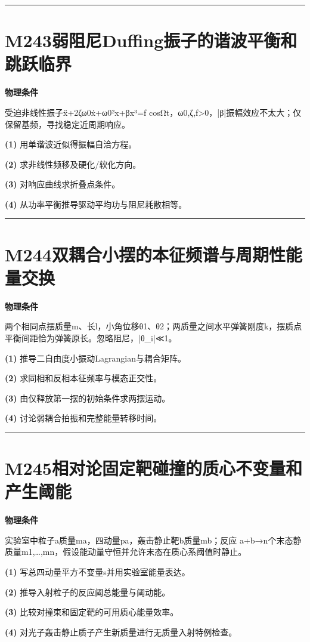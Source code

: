 \documentclass[UTF8,a4paper,11pt,oneside,openany]{ctexbook}
\begin{document}
\par\bigskip\hrule\bigskip
\section*{M243\quad 弱阻尼Duffing振子的谐波平衡和跳跃临界}
\textbf{物理条件}\par 受迫非线性振子ẍ+2ζω0ẋ+ω0²x+βx³=f cosΩt，ω0,ζ,f>0，|β|振幅效应不太大；仅保留基频，寻找稳定近周期响应。
\par\noindent\textbf{(1)} 用单谐波近似得振幅自洽方程。
\par\noindent\textbf{(2)} 求非线性频移及硬化/软化方向。
\par\noindent\textbf{(3)} 对响应曲线求折叠点条件。
\par\noindent\textbf{(4)} 从功率平衡推导驱动平均功与阻尼耗散相等。

\par\bigskip\hrule\bigskip
\section*{M244\quad 双耦合小摆的本征频谱与周期性能量交换}
\textbf{物理条件}\par 两个相同点摆质量m、长l，小角位移θ1、θ2；两质量之间水平弹簧刚度k，摆质点平衡间距恰为弹簧原长。忽略阻尼，|θ\_i|≪1。
\par\noindent\textbf{(1)} 推导二自由度小振动Lagrangian与耦合矩阵。
\par\noindent\textbf{(2)} 求同相和反相本征频率与模态正交性。
\par\noindent\textbf{(3)} 由仅释放第一摆的初始条件求两摆运动。
\par\noindent\textbf{(4)} 讨论弱耦合拍振和完整能量转移时间。

\par\bigskip\hrule\bigskip
\section*{M245\quad 相对论固定靶碰撞的质心不变量和产生阈能}
\textbf{物理条件}\par 实验室中粒子a质量ma，四动量pa，轰击静止靶b质量mb；反应 a+b→n个末态静质量m1,…,mn，假设能动量守恒并允许末态在质心系阈值时静止。
\par\noindent\textbf{(1)} 写总四动量平方不变量s并用实验室能量表达。
\par\noindent\textbf{(2)} 推导入射粒子的反应阈总能量与阈动能。
\par\noindent\textbf{(3)} 比较对撞束和固定靶的可用质心能量效率。
\par\noindent\textbf{(4)} 对光子轰击静止质子产生新质量进行无质量入射特例检查。
\end{document}
